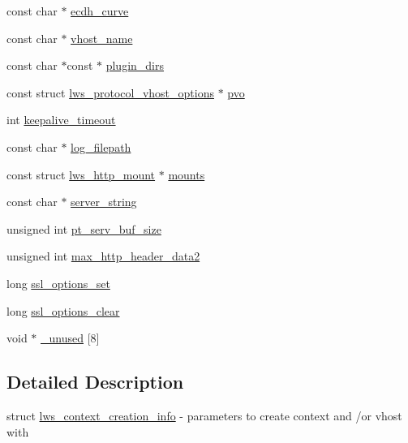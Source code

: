 \begin{DoxyCompactItemize}
\item 
const char $\ast$ \hyperlink{structlws__context__creation__info_afa5d4e7d9f86b58a1c6fac14f0a5f5f9}{ecdh\+\_\+curve}
\item 
const char $\ast$ \hyperlink{structlws__context__creation__info_ad50db098a208f045f7811207d2bee4b9}{vhost\+\_\+name}
\item 
const char $\ast$const $\ast$ \hyperlink{structlws__context__creation__info_a8122cfc0810bafe51edb3ba6bf9a1251}{plugin\+\_\+dirs}
\item 
const struct \hyperlink{structlws__protocol__vhost__options}{lws\+\_\+protocol\+\_\+vhost\+\_\+options} $\ast$ \hyperlink{structlws__context__creation__info_a999866fcd15dbd621773436f97190458}{pvo}
\item 
int \hyperlink{structlws__context__creation__info_a81697c6b763b5ef3ee52862bc70b07d6}{keepalive\+\_\+timeout}
\item 
const char $\ast$ \hyperlink{structlws__context__creation__info_ad0e95ba721f7bd2b676719f8093c23a2}{log\+\_\+filepath}
\item 
const struct \hyperlink{structlws__http__mount}{lws\+\_\+http\+\_\+mount} $\ast$ \hyperlink{structlws__context__creation__info_a13ffbb0d010309669611f8c4eda7d7f8}{mounts}
\item 
const char $\ast$ \hyperlink{structlws__context__creation__info_a137a9b9de4f6a7993fed8746d551e616}{server\+\_\+string}
\item 
unsigned int \hyperlink{structlws__context__creation__info_a57f88c0745adbd1d6b9b619b8de30209}{pt\+\_\+serv\+\_\+buf\+\_\+size}
\item 
unsigned int \hyperlink{structlws__context__creation__info_aa8d9e85e137f35fb006f2e4a53f0887a}{max\+\_\+http\+\_\+header\+\_\+data2}
\item 
long \hyperlink{structlws__context__creation__info_a704940261951ced6b5d8191bd8b9bb2d}{ssl\+\_\+options\+\_\+set}
\item 
long \hyperlink{structlws__context__creation__info_adb0bc0b28cd7d90ab306723d8ffa96fa}{ssl\+\_\+options\+\_\+clear}
\item 
void $\ast$ \hyperlink{structlws__context__creation__info_afce3b59950eca3203faa07381bbed5d7}{\+\_\+unused} \mbox{[}8\mbox{]}
\end{DoxyCompactItemize}


\subsection{Detailed Description}
struct \hyperlink{structlws__context__creation__info}{lws\+\_\+context\+\_\+creation\+\_\+info} -\/ parameters to create context and /or vhost with

